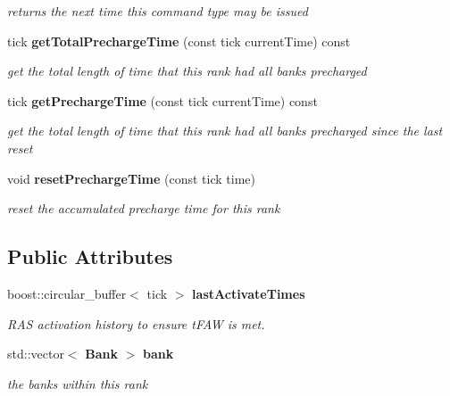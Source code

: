 \begin{DoxyCompactItemize}
\begin{DoxyCompactList}\small\item\em returns the next time this command type may be issued \item\end{DoxyCompactList}\item 
tick {\bf getTotalPrechargeTime} (const tick currentTime) const 
\begin{DoxyCompactList}\small\item\em get the total length of time that this rank had all banks precharged \item\end{DoxyCompactList}\item 
tick {\bf getPrechargeTime} (const tick currentTime) const 
\begin{DoxyCompactList}\small\item\em get the total length of time that this rank had all banks precharged since the last reset \item\end{DoxyCompactList}\item 
void {\bf resetPrechargeTime} (const tick time)\label{class_d_r_a_msim_i_i_1_1_rank_a322fa6968838e2c07924131af8b5b187}

\begin{DoxyCompactList}\small\item\em reset the accumulated precharge time for this rank \item\end{DoxyCompactList}\end{DoxyCompactItemize}
\subsection*{Public Attributes}
\begin{DoxyCompactItemize}
\item 
boost::circular\_\-buffer$<$ tick $>$ {\bf lastActivateTimes}\label{class_d_r_a_msim_i_i_1_1_rank_a4f99ad980186f688ca96c255b5c91942}

\begin{DoxyCompactList}\small\item\em RAS activation history to ensure tFAW is met. \item\end{DoxyCompactList}\item 
std::vector$<$ {\bf Bank} $>$ {\bf bank}\label{class_d_r_a_msim_i_i_1_1_rank_af1ecef74d5e6a979ab3fef7fafca907e}

\begin{DoxyCompactList}\small\item\em the banks within this rank \item\end{DoxyCompactList}\end{DoxyCompactItemize}
